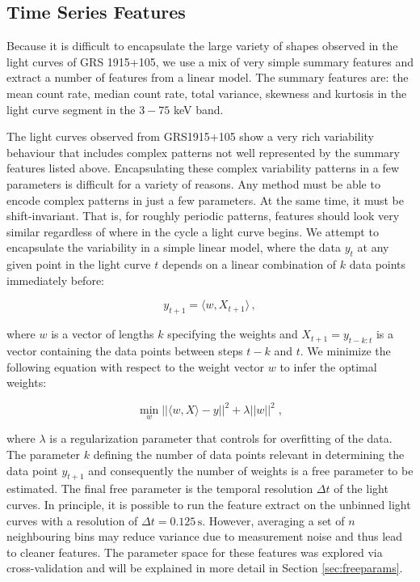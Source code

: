 \documentclass[12pt]{emulateapj}
\begin{document}
\subsection{Time Series Features}

Because it is difficult to encapsulate the large variety of shapes observed in the light curves of GRS 1915+105, we use a mix of very simple summary features and extract a number of features from a linear model. The summary features are: the mean count rate, median count rate, total variance, skewness and kurtosis in the light curve segment in the $3 - 75$ keV band. 

The light curves observed from GRS1915+105 show a very rich variability behaviour that includes complex patterns not well represented by the summary features listed above. Encapsulating these complex variability patterns in a few parameters is difficult for a variety of reasons. Any method must be able to encode complex patterns in just a few parameters. At the same time, it must be shift-invariant. That is, for roughly periodic patterns, features should look very similar regardless of where in the cycle a light curve begins. We attempt to encapsulate the variability in a simple linear model, where the data $y_t$ at any given point in the light curve $t$ depends on a linear combination of $k$ data points immediately before:

\begin{equation}
y_{t+1} = \langle w, X_{t+1} \rangle \, ,
\end{equation}

\noindent  where $w$ is a vector of lengths $k$ specifying the weights and $X_{t+1} = y_{t-k:t}$ is a vector containing the data points between steps $t-k$ and $t$.
We minimize the following equation with respect to the weight vector $w$ to infer the optimal weights:

\begin{equation}
\min_w ||\langle w, X \rangle - y||^2 + \lambda ||w||^2 \; ,
\end{equation}

\noindent where $\lambda$ is a regularization parameter that controls for overfitting of the data. The parameter $k$ defining the number of data points relevant in determining the data point $y_{t+1}$ and consequently the number of weights is a free parameter to be estimated. The final free parameter is the temporal resolution $\Delta t$ of the light curves. In principle, it is possible to run the feature extract on the unbinned light curves with a resolution of $\Delta t = 0.125\,\mathrm{s}$. However, averaging a set of $n$ neighbouring bins may reduce variance due to measurement noise and thus lead to cleaner features. The parameter space for these features was explored via cross-validation and will be explained in more detail in Section \ref{sec:freeparams}.
\end{document}
